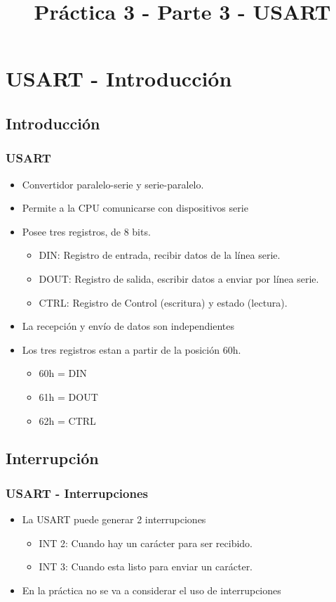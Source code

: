 \documentclass{beamer}
\title{Práctica 3 - Parte 3 - USART}
\begin{document}
\begin{frame}
\titlepage
\end{frame}

\section{USART - Introducción}
\subsection{Introducción}
\begin{frame}
\frametitle{USART}
\begin{itemize}
 \item Convertidor paralelo-serie y serie-paralelo.
 \item Permite a la CPU comunicarse con dispositivos serie
 \item Posee tres registros, de 8 bits.
  \begin{itemize}
   \item DIN: Registro de entrada, recibir datos de la línea serie.
   \item DOUT: Registro de salida, escribir datos a enviar por línea serie.
   \item CTRL: Registro de Control (escritura) y estado (lectura).
  \end{itemize}
 \item La recepción y envío de datos son independientes
 \item Los tres registros estan a partir de la posición 60h. 
  \begin{itemize}
      \item 60h = DIN
      \item 61h = DOUT
      \item 62h = CTRL
\end{itemize}
\end{itemize}
\end{frame}

\subsection{Interrupción}
\begin{frame}
\frametitle{USART - Interrupciones}
\begin{itemize}
 \item La USART puede generar 2 interrupciones
  \begin{itemize}
   \item INT 2: Cuando hay un carácter para ser recibido.
   \item INT 3: Cuando esta listo para enviar un carácter.
  \end{itemize}
  \item En la práctica no se va a considerar el uso de interrupciones
\end{itemize}
\end{frame}
\end{document}
